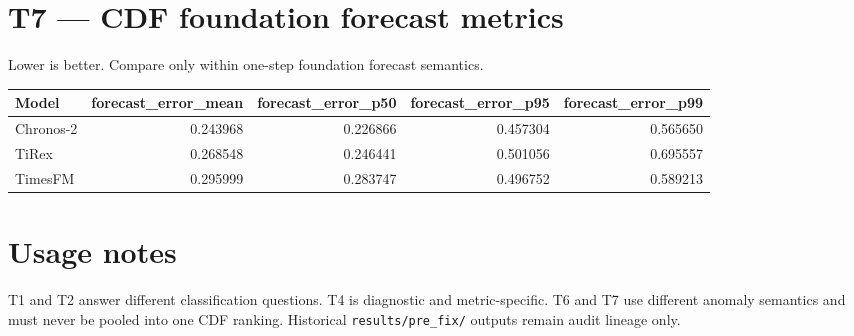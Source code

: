 \documentclass[11pt]{article}
\begin{document}
\section*{T7 --- CDF foundation forecast metrics}
Lower is better. Compare only within one-step foundation forecast semantics.

\begin{tabular}{lrrrr}
\toprule
Model & forecast\_error\_mean & forecast\_error\_p50 & forecast\_error\_p95 & forecast\_error\_p99 \\
\midrule
Chronos-2 & 0.243968 & 0.226866 & 0.457304 & 0.565650 \\
TiRex & 0.268548 & 0.246441 & 0.501056 & 0.695557 \\
TimesFM & 0.295999 & 0.283747 & 0.496752 & 0.589213 \\
\bottomrule
\end{tabular}

\section*{Usage notes}
T1 and T2 answer different classification questions. T4 is diagnostic and metric-specific. T6 and T7 use different anomaly semantics and must never be pooled into one CDF ranking. Historical \texttt{results/pre\_fix/} outputs remain audit lineage only.
\end{document}
